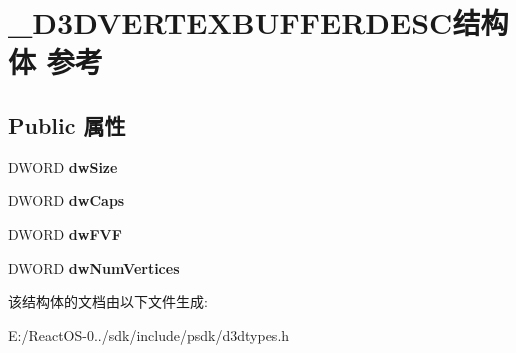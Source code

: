 \hypertarget{struct___d3_d_v_e_r_t_e_x_b_u_f_f_e_r_d_e_s_c}{}\section{\+\_\+\+D3\+D\+V\+E\+R\+T\+E\+X\+B\+U\+F\+F\+E\+R\+D\+E\+S\+C结构体 参考}
\label{struct___d3_d_v_e_r_t_e_x_b_u_f_f_e_r_d_e_s_c}
\subsection*{Public 属性}
\begin{DoxyCompactItemize}
\item 
\mbox{\label{struct___d3_d_v_e_r_t_e_x_b_u_f_f_e_r_d_e_s_c_a4e632d29f6f2c07ed6a70fd09a22b6a8}} 
D\+W\+O\+RD {\bfseries dw\+Size}
\item 
\mbox{\label{struct___d3_d_v_e_r_t_e_x_b_u_f_f_e_r_d_e_s_c_ac8095e276c3363db877fa0b2938628e2}} 
D\+W\+O\+RD {\bfseries dw\+Caps}
\item 
\mbox{\label{struct___d3_d_v_e_r_t_e_x_b_u_f_f_e_r_d_e_s_c_ae5bae56f5a83116cf8abbac3332408a8}} 
D\+W\+O\+RD {\bfseries dw\+F\+VF}
\item 
\mbox{\label{struct___d3_d_v_e_r_t_e_x_b_u_f_f_e_r_d_e_s_c_a0fb7faae4241ee07741e2de10389937f}} 
D\+W\+O\+RD {\bfseries dw\+Num\+Vertices}
\end{DoxyCompactItemize}


该结构体的文档由以下文件生成\+:\begin{DoxyCompactItemize}
\item 
E\+:/\+React\+O\+S-\/0../sdk/include/psdk/d3dtypes.\+h\end{DoxyCompactItemize}
